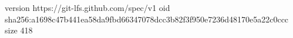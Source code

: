 version https://git-lfs.github.com/spec/v1
oid sha256:a1698c47b441ea58da9fbd66347078dcc3b82f3f950e7236d48170e5a22c0ccc
size 418
